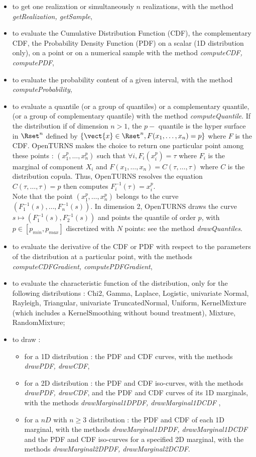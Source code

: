 \begin{itemize}
\item to get one realization or simultaneously $n$ realizations, with the method {\itshape getRealization, getSample},
\item to evaluate the Cumulative Distribution Function (CDF), the complementary CDF, the Probability Density Function (PDF) on a scalar (1D distribution only), on a point or on a numerical sample with the method {\itshape computeCDF, computePDF},
\item to evaluate the probability content of a given interval, with the method {\itshape computeProbability},
\item to evaluate a quantile (or a group of quantiles) or a complementary quantile, (or a group of complementary quantile) with the method {\itshape computeQuantile}. If the distribution if of dimension $n>1$, the $p-$ quantile is the hyper surface in $\Rset^n$ defined by  $\{\vect{x}\in \Rset^n, F(x_1, \dots, x_n) = p \}$ where $F$ is the CDF. OpenTURNS makes the choice to return one particular point among these points : $(x_1^p, \dots, x_n^p)$ such that $\forall i, F_i(x_i^p) =  \tau$ where $F_i$ is the marginal of component $X_i$ and $F(x_1, \dots, x_n) = C(\tau, \dots, \tau)$ where $C$ is the distribution copula. Thus, OpenTURNS resolves the equation $ C(\tau, \dots, \tau)=p$ then computes $F_i^{-1}(\tau) = x_i^p$.\\
  Note that the point  $(x_1^p, \dots, x_n^p)$ belongs to the curve $(F_1^{-1}(s), \dots, F_n^{-1}(s))$. In dimension 2, OpenTURNS draws the curve $s \mapsto (F_1^{-1}(s), F_2^{-1}(s))$ and points the quantile of order $p$, with $p\in [p_{min}, p_{max}]$ discretized with $N$ points: see the method {\itshape drawQuantiles}.
\item to evaluate the derivative of the CDF or PDF with respect to the parameters of the distribution at a particular point, with the methods {\itshape computeCDFGradient, computePDFGradient},
\item to evaluate the characteristic function of the distribution, only for the following distributions : Chi2, Gamma, Laplace, Logistic, univariate Normal, Rayleigh, Triangular, univariate TruncatedNormal, Uniform, KernelMixture (which includes a KernelSmoothing without bound treatment), Mixture, RandomMixture;
\item to draw :
  \begin{itemize}
  \item for a 1D distribution : the PDF and CDF curves, with the methods {\itshape drawPDF, drawCDF},
  \item for a 2D distribution : the PDF and CDF iso-curves, with the methods {\itshape drawPDF, drawCDF}, and the PDF and CDF curves of its 1D marginals, with the methods {\itshape drawMarginal1DPDF, drawMarginal1DCDF} ,
  \item for a $nD$ with $n\geq 3$ distribution : the PDF and CDF of each 1D marginal, with the methods {\itshape drawMarginal1DPDF, drawMarginal1DCDF} and the PDF and CDF iso-curves for a specified 2D marginal, with the methods {\itshape drawMarginal2DPDF, drawMarginal2DCDF}.
  \end{itemize}
\end{itemize}

